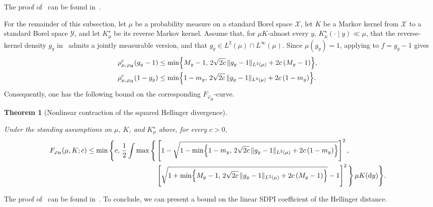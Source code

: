 \documentclass[11pt]{article}
\theoremstyle{plain}
\newtheorem{theorem}{Theorem}[section]
\theoremstyle{remark}
\begin{document}
The proof of~ can be found in~.

For the remainder of this subsection, let $\mu$ be a probability measure on a standard Borel space $\mathcal X$, let $K$ be a Markov kernel from $\mathcal X$ to a standard Borel space $\mathcal Y$, and let $K_\mu^\star$ be its reverse Markov kernel. Assume that, for $\mu K$-almost every $y$, $K_\mu^\star(\cdot\mid y)\ll\mu$, that the reverse-kernel density $g_y$ in~ admits a jointly measurable version, and that $g_y\in L^2(\mu)\cap L^\infty(\mu)$.
Since $\mu(g_y)=1$, applying
to $f=g_y-1$ gives
\begin{align}
    \rho_{\mu,\varphi_{\mathrm H}}^c(g_y-1)
    &\leq
    \min\Bigl\{
        M_y-1,\,
        2\sqrt{2c}\,
        \lVert g_y-1\rVert_{L^2(\mu)}
        +
        2c\left(
        M_y-1
        \right)
    \Bigr\},
    \label{eq:hellingerPositiveGaugeChannelClipped}\\
    \rho_{\mu,\varphi_{\mathrm H}}^c(1-g_y)
    &\leq
    \min\Bigl\{
        1-m_y,\,
        2\sqrt{2c}\,
        \lVert g_y-1\rVert_{L^2(\mu)}
        +
        2c\left(
        1-m_y
        \right)
    \Bigr\}.
    \label{eq:hellingerNegativeGaugeChannelClipped}
\end{align}
Consequently, one has the following bound on the corresponding $F_{\varphi_{\mathrm H}}$-curve.
\begin{theorem}[Nonlinear contraction of the squared Hellinger divergence]
\label{thm:hellingerNonlinearContraction}

Under the standing assumptions on $\mu$, $K$, and $K_\mu^\star$ above, for every $c>0$,
\begin{align}
F_{\varphi_{\mathrm H}}(\mu,K;c)
\leq
\min\Bigg\{
c,\,
\frac{1}{2}
\int
\max\Bigg\{
&\left[
1-
\sqrt{
1-
\min\Bigl\{
1-m_y,\,
2\sqrt{2c}\,
\lVert g_y-1\rVert_{L^2(\mu)}
+
2c\left(
1-m_y
\right)
\Bigr\}
}
\right]^2,
\nonumber\\
&
\left[
\sqrt{
1+
\min\Bigl\{
M_y-1,\,
2\sqrt{2c}\,
\lVert g_y-1\rVert_{L^2(\mu)}
+
2c\left(
M_y-1
\right)
\Bigr\}
}
-1
\right]^2
\Bigg\}
\,\mu K(\mathrm dy)
\Bigg\}.
\label{eq:hellingerNonlinearContraction}
\end{align}
\end{theorem}

The proof of~ can be found in~.
To conclude, we can present a bound on the linear SDPI coefficient of the Hellinger distance.
\end{document}
